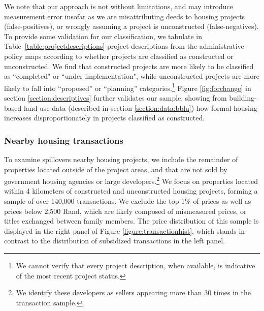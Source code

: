 \documentclass[12pt]{article}
\begin{document}
We note that our approach is not without limitations, and may introduce measurement error insofar as we are misattributing deeds to housing projects (false-positives), or wrongly assuming a project is unconstructed (false-negatives). To provide some validation for our classification, we tabulate in Table~\ref{table:projectdescriptions} project descriptions from the administrative policy maps according to whether projects are classified as constructed or unconstructed. We find that constructed projects are more likely to be classified as ``completed" or ``under implementation", while unconstructed projects are more likely to fall into ``proposed'' or ``planning'' categories.\footnote{We cannot verify that every project description, when available, is indicative of the most recent project status.} Figure \ref{fig:forchange} in section \ref{section:descriptives} further validates our sample, showing from building-based land use data (described in section \ref{section:data:bblu}) how formal housing increases disproportionately in projects classified as constructed. 


\subsubsection*{Nearby housing transactions}

To examine spillovers nearby housing projects, we include the remainder of properties located outside of the project areas, and that are not sold by government housing agencies or large developers.\footnote{We identify these developers as sellers appearing more than 30 times in the transaction sample.} We focus on properties located within 4 kilometers of constructed and unconstructed housing projects, forming a sample of over 140,000 transactions.  We exclude the top 1\% of prices as well as prices below 2,500 Rand, which are likely composed of mismeasured prices, or titles exchanged between family members. The price distribution of this sample is displayed in the right panel of Figure \ref{figure:transactionhist}, which stands in contrast to the distribution of subsidized transactions in the left panel. %

\end{document}
